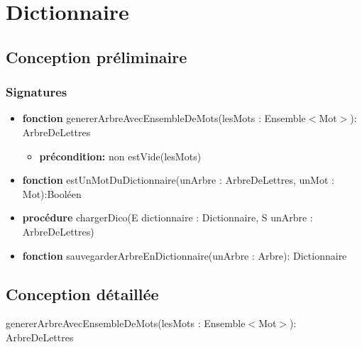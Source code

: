 \documentclass{article}
\begin{document}
    \pagestyle{empty}
    \noindent

    \section*{Dictionnaire}
    \subsection*{Conception préliminaire}
    \subsubsection*{Signatures}

	\begin{itemize}[label=$\ $, leftmargin=1cm]
		 \item \textbf{fonction} genererArbreAvecEnsembleDeMots(lesMots : Ensemble$<$Mot$>$): ArbreDeLettres
		 \begin{itemize}[label=$| $] 
            \item \textbf{précondition:} non estVide(lesMots) 
         \end{itemize}
		 \item \textbf{fonction} estUnMotDuDictionnaire(unArbre : ArbreDeLettres, unMot : Mot):Booléen
         \item \textbf{procédure} chargerDico(E dictionnaire : Dictionnaire, S unArbre : ArbreDeLettres) 
         \item \textbf{fonction} sauvegarderArbreEnDictionnaire(unArbre : Arbre): Dictionnaire
	\end{itemize}
	
    \subsection*{Conception détaillée}

    \begin{function}
    \SetAlgoLined
    \caption{genererArbreAvecEnsembleDeMots(lesMots : Ensemble$<$Mot$>$): ArbreDeLettres}
     \\
    \end{function}
    
\end{document}
